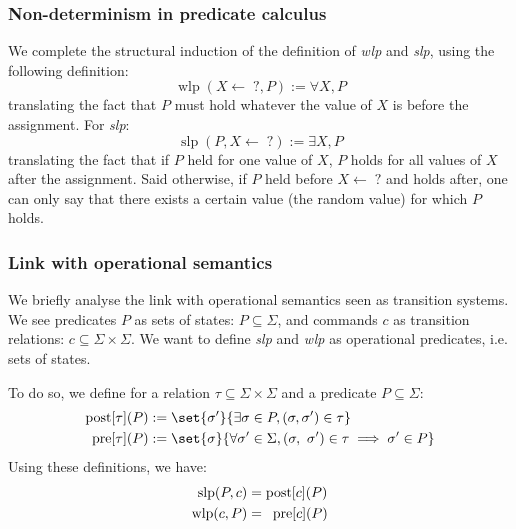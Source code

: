 \documentclass[toc]{../cs-classes/cs-classes}
\DeclareMathOperator{\wlp}{wlp}
\DeclareMathOperator{\slp}{slp}
\begin{document}
\subsubsection{Non-determinism in predicate calculus}
We complete the structural induction of the definition of \emph{wlp} and \emph{slp}, using the following definition:
\begin{equation*}
    \wlp(X\leftarrow\;?, P) := \forall X, P
\end{equation*}
translating the fact that $P$ must hold whatever the value of $X$ is before the assignment. For \emph{slp}:
\begin{equation*}
    \slp(P, X\leftarrow\;?) := \exists X, P
\end{equation*}
translating the fact that if $P$ held for one value of $X$, $P$ holds for all values of $X$ after the assignment. Said otherwise, if $P$ held before $X\leftarrow\;?$ and holds after, one can only say that there exists a certain value (the random value) for which $P$ holds.

\subsubsection{Link with operational semantics}
We briefly analyse the link with operational semantics seen as transition systems. We see predicates $P$ as sets of states: $P\subseteq\Sigma$, and commands $c$ as transition relations: $c\subseteq\Sigma\times\Sigma$. We want to define \emph{slp} and \emph{wlp} as operational predicates, i.e. sets of states. 

To do so, we define for a relation $\tau\subseteq\Sigma\times\Sigma$ and a predicate $P\subseteq\Sigma$:
\begin{equation*}
    \begin{aligned}
        \textnormal{post}[\tau](P) &:= \set{\sigma'}{\exists\sigma\in P, (\sigma, \sigma')\in\tau}\\
        \textnormal{pre}[\tau](P) &:= \set{\sigma}{\forall\sigma'\in\Sigma, (\sigma, \sigma')\in\tau\implies\sigma'\in P}
    \end{aligned}
\end{equation*}
Using these definitions, we have:
\begin{equation*}
    \begin{aligned}
        \slp(P, c) &= \textnormal{post}[c](P)\\
        \wlp(c, P) &= \phantom{p}\textnormal{pre}[c](P)
    \end{aligned}
\end{equation*}
\end{document}

